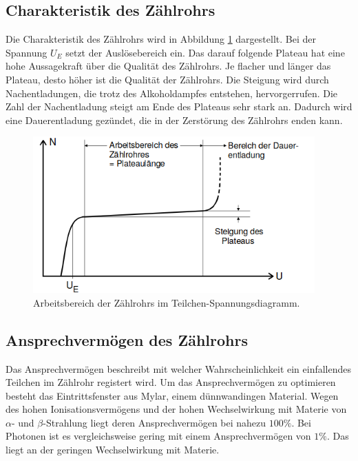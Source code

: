 \subsection{Charakteristik des Zählrohrs}
Die Charakteristik des Zählrohrs wird in Abbildung \ref{fig:char} dargestellt.
Bei der Spannung $U_E$ setzt der Auslösebereich ein.
Das darauf folgende Plateau hat eine hohe Aussagekraft über die Qualität des Zählrohrs.
Je flacher und länger das Plateau, desto höher ist die Qualität der Zählrohrs.
Die Steigung wird durch Nachentladungen, die trotz des Alkoholdampfes entstehen, hervorgerrufen.
Die Zahl der Nachentladung steigt am Ende des Plateaus sehr stark an.
Dadurch wird eine Dauerentladung gezündet, die in der Zerstörung des Zählrohrs enden kann.

\begin{figure}[h]
    \centering
    \includegraphics[height=6cm]{Theorie/char.png}
    \caption{Arbeitsbereich der Zählrohrs im Teilchen-Spannungsdiagramm.}
    \label{fig:char}
\end{figure}

\subsection{Ansprechvermögen des Zählrohrs}
Das Ansprechvermögen beschreibt mit welcher Wahrscheinlichkeit ein einfallendes Teilchen im Zählrohr registert wird.
Um das Ansprechvermögen zu optimieren besteht das Eintrittsfenster aus Mylar, einem dünnwandingen Material.
Wegen des hohen Ionisationsvermögens und der hohen Wechselwirkung mit Materie von $\alpha$- und $\beta$-Strahlung liegt deren Ansprechvermögen bei nahezu $100\%$.
Bei Photonen ist es vergleichsweise gering mit einem Ansprechvermögen von $1\%$.
Das liegt an der geringen Wechselwirkung mit Materie.
